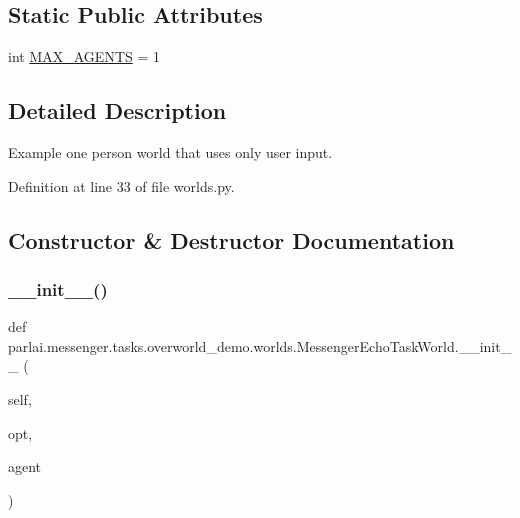 \subsection*{Static Public Attributes}
\begin{DoxyCompactItemize}
\item 
int \hyperlink{classparlai_1_1messenger_1_1tasks_1_1overworld__demo_1_1worlds_1_1MessengerEchoTaskWorld_ae454a3caeae9e4c642bbb4bb0a621cfd}{M\+A\+X\+\_\+\+A\+G\+E\+N\+TS} = 1
\end{DoxyCompactItemize}


\subsection{Detailed Description}
\begin{DoxyVerb}Example one person world that uses only user input.\end{DoxyVerb}
 

Definition at line 33 of file worlds.\+py.



\subsection{Constructor \& Destructor Documentation}
\mbox{\label{classparlai_1_1messenger_1_1tasks_1_1overworld__demo_1_1worlds_1_1MessengerEchoTaskWorld_afd56dc8d1deb99780ff3fa5fb6e42a72}} 
\subsubsection{\texorpdfstring{\+\_\+\+\_\+init\+\_\+\+\_\+()}{\_\_init\_\_()}}
{\footnotesize\ttfamily def parlai.\+messenger.\+tasks.\+overworld\+\_\+demo.\+worlds.\+Messenger\+Echo\+Task\+World.\+\_\+\+\_\+init\+\_\+\+\_\+ (\begin{DoxyParamCaption}\item[{}]{self,  }\item[{}]{opt,  }\item[{}]{agent }\end{DoxyParamCaption})}



